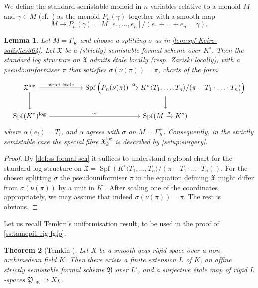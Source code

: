 \documentclass[a4paper,twoside,11pt,reqno]{amsart}
\newcommand{\fX}{{\mathfrak{X}}}
\newcommand{\fY}{{\mathfrak{Y}}}
\newcommand{\la}{\longrightarrow}
\DeclareMathOperator{\Spf}{Spf}
\newcommand{\rig}{{\rm rig}}
\newtheorem{thm}{Theorem}[subsection]
\newtheorem{lem}[thm]{Lemma}
\theoremstyle{definition}
\numberwithin{equation}{subsection}
\begin{document}
We define the standard semistable monoid in $n$ variables relative to a monoid $M$ and $\gamma \in M$ (cf.\ \cite[Example~2.4.5]{AHLS-Log}) as the monoid $P_n(\gamma)$ together with a smooth map 
\[
M \la P_n(\gamma) = M[e_1,\ldots,e_n]/(e_1 + \ldots + e_n = \gamma).
\]

\begin{lem} \label{lem:strictly-semistable-formal-scheme-reduces-to-setup364}
Let $M = \Gamma_K^+$ and choose a splitting $\sigma$ as in \cref{lem:spf-Kcirc-satisfies364}. 
Let $\fX$ be a (strictly) semistable formal scheme over $K^\circ$. Then the standard log structure on $\fX$ admits \'etale  locally (resp.\ Zariski locally), with a pseudouniformiser $\pi$ that satisfies 
$\sigma(\nu(\pi)) = \pi$, charts of the form 
\[
    \begin{tikzcd}
        \fX^{\log} \arrow[rr,"\text{strict \'etale}"] \arrow[d]
        && \Spf\left(P_n(\nu(\pi)) \xrightarrow{\alpha} K^\circ\langle T_1,\dots, T_n\rangle/(\pi - T_1\cdot\ldots\cdot T_n) \right) \arrow[d] \\
        \Spf(K^\circ)^{\log}  \arrow[rr,"\sim"] & &  
        \Spf(M \xrightarrow{\sigma} K^\circ) 
    \end{tikzcd}
\]
where $\alpha(e_i) = T_i$, and $\alpha$ agrees with $\sigma$ on $M = \Gamma_K^+$.
Consequently, in the strictly semistable case the special fibre $\fX^{\log}_k$ is described by \cref{setup:surgery}. 
\end{lem}

\begin{proof}
    By \cref{def:ss-formal-sch} it suffices to understand a global chart for the standard log structure on $\fX = \Spf\left( K^\circ\langle T_1,\dots, T_n\rangle/(\pi - T_1\cdot\ldots\cdot T_n) \right)$. For the chosen splitting $\sigma$ the pseudouniformiser $\pi$ in the equation defining $\fX$ might differ from $\sigma(\nu(\pi))$ by a unit in $K^\circ$. After scaling one of the coordinates appropriately, we may assume that indeed $\sigma(\nu(\pi)) = \pi$. The rest is obvious.     
\end{proof}

Let us recall Temkin's uniformisation result, to be used in the proof of \cref{ss:tamepi1-rig-fgfp}.

\begin{thm}[{Temkin \cite[Corollary~3.3.2]{Temkin2017:AlteredLocalUniformization}}] \label{thm:Temkin-unif}
    Let $X$ be a smooth qcqs rigid space over a non-archimedean field $K$. Then there exists a finite extension $L$ of $K$, an affine strictly semistable formal scheme $\fY$ over $L^\circ$, and a surjective \'etale map of rigid $L$-spaces $\fY_\rig\to X_L$.
\end{thm}
\end{document}
